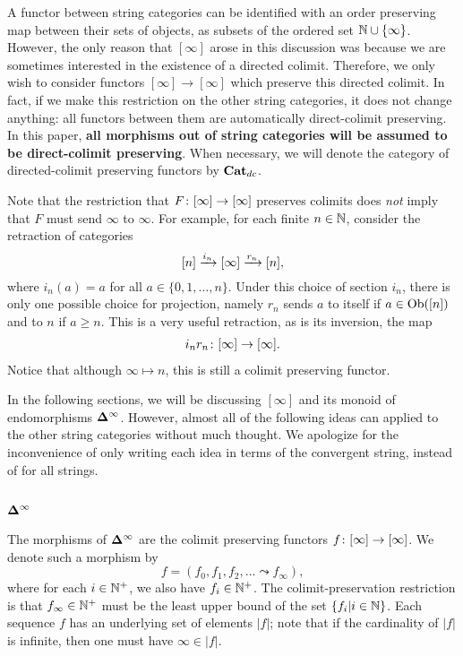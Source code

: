 \documentclass{amsart}
\def\Del{{\bf \Delta}}
\def\Delinf{{\Del^\infty}}
\def\Catdc{{\Cat_{dc}}}
\def\NNN{\NN^+}
\begin{document}
A functor between string categories can be identified with an order preserving map between their sets of objects, as subsets of the ordered set ${\mathbb N}\cup\{\infty\}$.  However, the only reason that $[\infty]$ arose in this discussion was because we are sometimes interested in the existence of a directed colimit.  Therefore, we only wish to consider functors $[\infty]\to[\infty]$ which preserve this directed colimit.  In fact, if we make this restriction on the other string categories, it does not change anything: all functors between them are automatically direct-colimit preserving.  In this paper, {\bf all morphisms out of string categories will be assumed to be direct-colimit preserving}.  When necessary, we will denote the category of directed-colimit preserving functors by $\Catdc$.

Note that the restriction that $F\colon[\infty]\rightarrow[\infty]$ preserves colimits does {\em not} imply that $F$ must send $\infty$ to $\infty$.  For example, for each finite $n\in{\mathbb N}$, consider the retraction of categories $$[n]\xrightarrow{i_n}[\infty]\xrightarrow{r_n}[n],$$ where $i_n(a)=a$ for all $a\in\{0,1,\ldots,n\}$.  Under this choice of section $i_n$, there is only one possible choice for projection, namely $r_n$ sends $a$ to itself if $a\in\textnormal{Ob}([n])$ and to $n$ if $a\geq n$.  This is a very useful retraction, as is its inversion, the map \begin{eqnarray}\label{inrn}i_nr_n\colon[\infty]\rightarrow[\infty].\end{eqnarray}  Notice that although $\infty\mapsto n$, this is still a colimit preserving functor.

In the following sections, we will be discussing $[\infty]$ and its monoid of endomorphisms $\Delinf$.  However, almost all of the following ideas can applied to the other string categories without much thought.  We apologize for the inconvenience of only writing each idea in terms of the convergent string, instead of for all strings.

\subsection{$\Delinf$}

The morphisms of $\Delinf$ are the colimit preserving functors $f\colon[\infty]\rightarrow[\infty]$.  We denote such a morphism by $$f=(f_0,f_1,f_2,\ldots\leadsto f_\infty),$$ where for each $i\in\NNN$, we also have $f_i\in\NNN$. The colimit-preservation restriction is that $f_\infty\in\NNN$ must be the least upper bound of the set $\{f_i|i\in{\mathbb N}\}$.  Each sequence $f$ has an underlying set of elements $|f|$; note that if the cardinality of $|f|$ is infinite, then one must have $\infty\in|f|$.  
\end{document}
